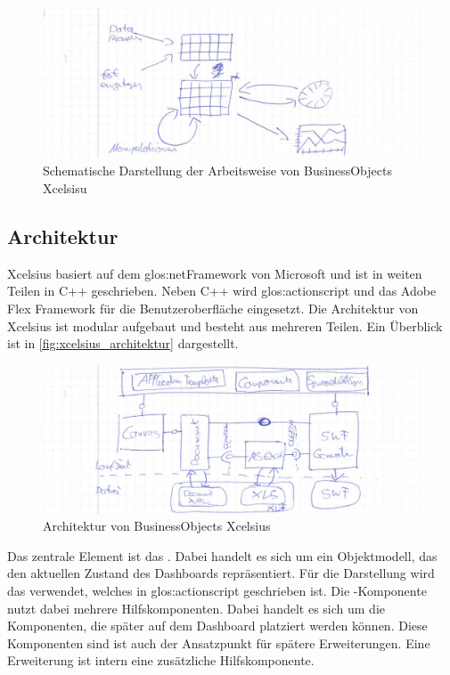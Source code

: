 \begin{onehalfspacing}
\begin{figure}[h]
\centering
\setlength{\unitlength}{1mm}
\includegraphics[width=15cm]{images/Xcelsius_UI_Ablauf.jpg}
\caption{Schematische Darstellung der Arbeitsweise von BusinessObjects Xcelsisu\label{fig:xcelsius_ablauf_schema}}
\end{figure} 

\subsection{Architektur}
\gls{Xcelsius} basiert auf dem \gls{glos:netFramework} von Microsoft und ist in weiten Teilen in C++ geschrieben. Neben C++ wird \gls{glos:actionscript} und das Adobe Flex Framework für die  Benutzeroberfläche eingesetzt. Die Architektur von \gls{Xcelsius} ist modular aufgebaut und besteht aus mehreren Teilen. Ein Überblick ist in \vref{fig:xcelsius_architektur} dargestellt.

\begin{figure}[h]
\centering
\setlength{\unitlength}{1mm}
\includegraphics[width=15cm]{images/Xcelsius_Architecture.jpg}
\caption{Architektur von BusinessObjects Xcelsius\label{fig:xcelsius_architektur}}
\end{figure} 

Das zentrale Element ist das . Dabei handelt es sich um ein Objektmodell, das den aktuellen Zustand des Dashboards repräsentiert. Für die Darstellung wird das  verwendet, welches in \gls{glos:actionscript} geschrieben ist. Die -Komponente nutzt dabei mehrere Hilfskomponenten. Dabei handelt es sich um die Komponenten, die später auf dem Dashboard platziert werden können. Diese Komponenten sind ist auch der Ansatzpunkt für spätere Erweiterungen. Eine Erweiterung ist intern eine zusätzliche Hilfskomponente.


\end{onehalfspacing}
